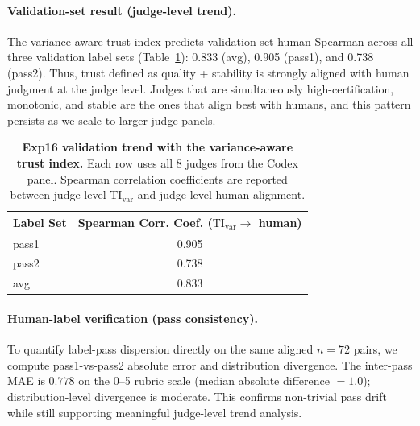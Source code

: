 \documentclass{article}
\begin{document}
\paragraph{Validation-set result (judge-level trend).}
The variance-aware trust index predicts validation-set human Spearman across all three validation label sets (Table~\ref{tab:exp16_final_trend}):
0.833 (avg), 0.905 (pass1), and 0.738 (pass2).
Thus, trust defined as quality + stability is strongly aligned with human judgment at the judge level. Judges that are simultaneously high-certification, monotonic, and stable are the ones that align best with humans, and this pattern persists as we scale to larger judge panels.

\begin{table}[t]
  \centering
  \small
  \begin{tabular}{lc}
    \toprule
    \textbf{Label Set} & \textbf{Spearman Corr. Coef. (\(\mathrm{TI}_{\mathrm{var}}\rightarrow\) human)} \\
    \midrule
    pass1              & 0.905                                                                           \\
    pass2              & 0.738                                                                           \\
    avg                & 0.833                                                                           \\
    \bottomrule
  \end{tabular}
  \caption{\textbf{Exp16 validation trend with the variance-aware trust index.}
  Each row uses all \(8\) judges from the Codex panel.
  Spearman correlation coefficients are reported between judge-level \(\mathrm{TI}_{\mathrm{var}}\) and judge-level human alignment.}
  \label{tab:exp16_final_trend}
\end{table}

\paragraph{Human-label verification (pass consistency).}
To quantify label-pass dispersion directly on the same aligned \(n=72\) pairs, we compute pass1-vs-pass2 absolute error and distribution divergence.
The inter-pass MAE is \(0.778\) on the 0--5 rubric scale (median absolute difference \(=1.0\)); distribution-level divergence is moderate.
This confirms non-trivial pass drift while still supporting meaningful judge-level trend analysis.
\end{document}
